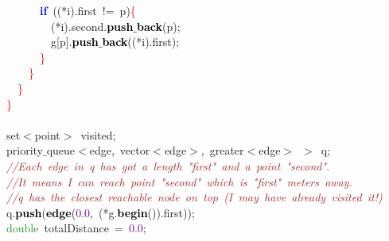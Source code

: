 \mbox{}\ \ \ \ \ \ \ \ \ \ \textbf{\textcolor{Blue}{if}}\ \textcolor{BrickRed}{((*}i\textcolor{BrickRed}{).}first\ \textcolor{BrickRed}{!=}\ p\textcolor{BrickRed}{)}\textcolor{Red}{\{} \\
\mbox{}\ \ \ \ \ \ \ \ \ \ \ \ \textcolor{BrickRed}{(*}i\textcolor{BrickRed}{).}second\textcolor{BrickRed}{.}\textbf{\textcolor{Black}{push$\_$back}}\textcolor{BrickRed}{(}p\textcolor{BrickRed}{);} \\
\mbox{}\ \ \ \ \ \ \ \ \ \ \ \ g\textcolor{BrickRed}{[}p\textcolor{BrickRed}{].}\textbf{\textcolor{Black}{push$\_$back}}\textcolor{BrickRed}{((*}i\textcolor{BrickRed}{).}first\textcolor{BrickRed}{);} \\
\mbox{}\ \ \ \ \ \ \ \ \ \ \textcolor{Red}{\}} \\
\mbox{}\ \ \ \ \ \ \ \ \textcolor{Red}{\}} \\
\mbox{}\ \ \ \ \ \ \textcolor{Red}{\}} \\
\mbox{}\ \ \ \ \textcolor{Red}{\}} \\
\mbox{} \\
\mbox{}\ \ \ \ set\textcolor{BrickRed}{$<$}point\textcolor{BrickRed}{$>$}\ visited\textcolor{BrickRed}{;} \\
\mbox{}\ \ \ \ priority$\_$queue\textcolor{BrickRed}{$<$}edge\textcolor{BrickRed}{,}\ vector\textcolor{BrickRed}{$<$}edge\textcolor{BrickRed}{$>$,}\ greater\textcolor{BrickRed}{$<$}edge\textcolor{BrickRed}{$>$}\ \textcolor{BrickRed}{$>$}\ q\textcolor{BrickRed}{;} \\
\mbox{}\ \ \ \ \textit{\textcolor{Brown}{//Each\ edge\ in\ q\ has\ got\ a\ length\ "{}first"{}\ and\ a\ point\ "{}second"{}.}} \\
\mbox{}\ \ \ \ \textit{\textcolor{Brown}{//It\ means\ I\ can\ reach\ point\ "{}second"{}\ which\ is\ "{}first"{}\ meters\ away.}} \\
\mbox{}\ \ \ \ \textit{\textcolor{Brown}{//q\ has\ the\ closest\ reachable\ node\ on\ top\ (I\ may\ have\ already\ visited\ it!)}} \\
\mbox{}\ \ \ \ q\textcolor{BrickRed}{.}\textbf{\textcolor{Black}{push}}\textcolor{BrickRed}{(}\textbf{\textcolor{Black}{edge}}\textcolor{BrickRed}{(}\textcolor{Purple}{0.0}\textcolor{BrickRed}{,}\ \textcolor{BrickRed}{(*}g\textcolor{BrickRed}{.}\textbf{\textcolor{Black}{begin}}\textcolor{BrickRed}{()).}first\textcolor{BrickRed}{));} \\
\mbox{}\ \ \ \ \textcolor{ForestGreen}{double}\ totalDistance\ \textcolor{BrickRed}{=}\ \textcolor{Purple}{0.0}\textcolor{BrickRed}{;} \\
